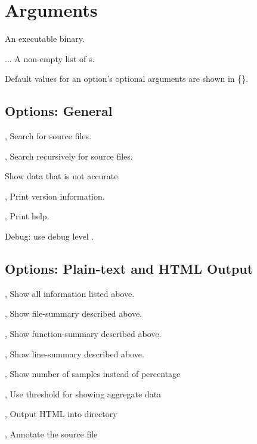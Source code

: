 \documentclass[english]{article}
\begin{document}
\section{Arguments}

\begin{Description}
\item[\Arg{binary}] An executable binary.
\item[\Arg{hpcrun-file}...] A non-empty list of s.
\end{Description}

Default values for an option's optional arguments are shown in \{\}.

\subsection{Options: General}

\begin{Description}
\item[\OptArg{-d}{dir}, \OptArg{--directory}{dir}] Search  for source files.
\item[\OptArg{-D}{dir}, \OptArg{--recursive-directory}{dir}] Search  recursively for source files.
\item[\Opt{--force}] Show data that is not accurate.
\item[\Opt{-V}, \Opt{--version}] Print version information.
\item[\Opt{-h}, \Opt{--help}] Print help.
\item[\OptArg{--debug}{n}]   Debug: use debug level .
\end{Description}

\subsection{Options: Plain-text and HTML Output}
\begin{Description}
  \item[\Opt{-e}, \Opt{--everything}] Show all information listed above.
  \item[\Opt{-f}, \Opt{--files}] Show file-summary described above.
  \item[\Opt{-r}, \Opt{--funcs}] Show function-summary described above.
  \item[\Opt{-l}, \Opt{--lines}] Show line-summary described above.

  \item[\Opt{-n}, \Opt{--number}] Show number of samples instead of percentage
  \item[\OptArg{-s}{n}, \OptArg{--show}{n}] Use threshold  for showing aggregate data

  \item[\OptArg{-H}{dir}, \OptArg{--html}{dir}] Output HTML into directory 
  \item[\OptArg{-a}{file}, \OptArg{--annotate}{file}] Annotate the source file 
\end{Description}
\end{document}
